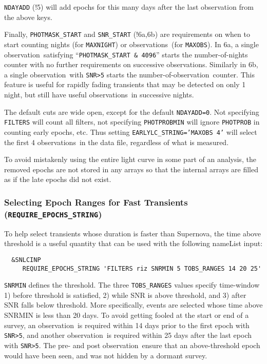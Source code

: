 \documentclass[12pt]{article}
\newcommand{\obs}{observation}
\newcommand{\obss}{observations}
\begin{document}
{\tt NDAYADD} (!5) will add epochs for this many days
after the last observation from the above keys.

Finally, {\tt PHOTMASK\_START} and {\tt SNR\_START} (!6a,6b) 
are requirements on when to start counting nights 
(for {\tt MAXNIGHT}) or \obss\ (for {\tt MAXOBS}).
In 6a, a single \obs\ satisfying 
``{\tt PHOTMASK\_START \& 4096}'' starts the number-of-nights 
counter with no further requirements on successive \obss.
Similarly in 6b, a single \obs\ with {\tt SNR>5} starts
the number-of-\obs\ counter.
This feature is useful for rapidly fading transients that may
be detected on only 1 night, but still have useful \obss\ in
successive nights.

The default cuts are wide open, except for the default {\tt NDAYADD=0}.
Not specifying {\tt FILTERS} will count all filters, 
not specifying {\tt PHOTPROBMIN} will
ignore {\tt PHOTPROB} in counting early epochs, etc.
Thus setting {\tt EARLYLC\_STRING='MAXOBS 4'} will select the
first 4 \obss\ in the data file, regardless of what
is measured.

To avoid mistakenly using the entire light curve in some 
part of an analysis,  the removed epochs are not stored 
in any arrays so that the internal arrays are filled
as if the late epochs did not exist.


  \subsubsection{Selecting Epoch Ranges for Fast Transients 
      ({\tt REQUIRE\_EPOCHS\_STRING}) }
  \label{sss:reqep}

To help select transients whose duration is faster than Supernova,
the time above threshold is a useful quantity that can be used with
the following nameList input:
\begin{verbatim}
  &SNLCINP
     REQUIRE_EPOCHS_STRING 'FILTERS riz SNRMIN 5 TOBS_RANGES 14 20 25'
\end{verbatim}
%
{\tt SNRMIN} defines the threshold. The three {\tt TOBS\_RANGES}
values specify time-window 1) before threshold is satisfied, 2) while
SNR is above threshold, and 3) after SNR falls below threshold.
More specifically, events are selected whose time above SNRMIN
is less than 20 days. To avoid getting fooled at the start or end
of a survey, an \obs\ is required within 14 days prior to the first
epoch with {\tt SNR>5}, and another \obs\ is required within
25 days after the last epoch with {\tt SNR>5}. The pre- and post
\obs\ ensure that an above-threshold epoch would have been seen,
and was not hidden by a dormant survey.
\end{document}
